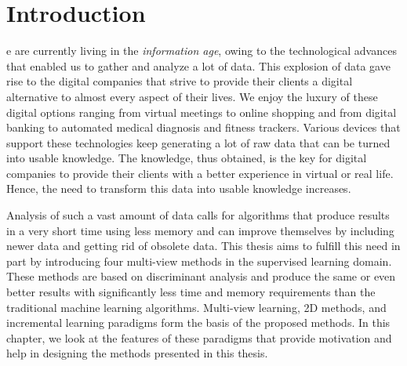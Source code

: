 \chapter{Introduction}
\label{ch:Intro}
e are currently living in the \textit{information age}, owing to the technological advances that enabled us to gather and analyze a lot of data. This explosion of data gave rise to the digital companies that strive to provide their clients a digital alternative to almost every aspect of their lives. We enjoy the luxury of these digital options ranging from virtual meetings to online shopping and from digital banking to automated medical diagnosis and fitness trackers. Various devices that support these technologies keep generating a lot of raw data that can be turned into usable knowledge. The knowledge, thus obtained, is the key for digital companies to provide their clients with a better experience in virtual or real life. Hence, the need to transform this data into usable knowledge increases.

Analysis of such a vast amount of data calls for algorithms that produce results in a very short time using less memory and can improve themselves by including newer data and getting rid of obsolete data. This thesis aims to fulfill this need in part by introducing four multi-view methods in the supervised learning domain. These methods are based on discriminant analysis and produce the same or even better results with significantly less time and memory requirements than the traditional machine learning algorithms. Multi-view learning, 2D methods, and incremental learning paradigms form the basis of the proposed methods. In this chapter, we look at the features of these paradigms that provide motivation and help in designing the methods presented in this thesis.








